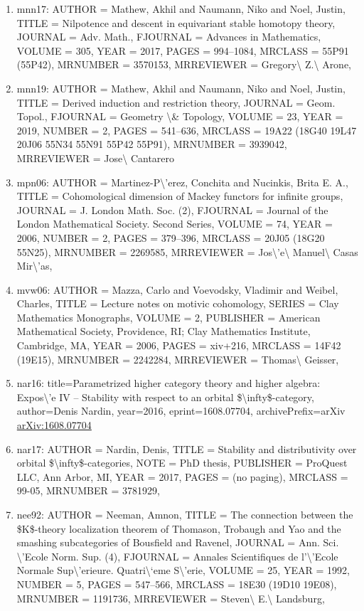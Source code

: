 \documentclass[11pt]{article}
\begin{document}
\begin{enumerate}[leftmargin=*]
  \item mnn17: AUTHOR = Mathew, Akhil and Naumann, Niko and Noel, Justin, TITLE = Nilpotence and descent in equivariant stable homotopy theory, JOURNAL = Adv. Math., FJOURNAL = Advances in Mathematics, VOLUME = 305, YEAR = 2017, PAGES = 994--1084, MRCLASS = 55P91 (55P42), MRNUMBER = 3570153, MRREVIEWER = Gregory\textbackslash{} Z.\textbackslash{} Arone,
  \item mnn19: AUTHOR = Mathew, Akhil and Naumann, Niko and Noel, Justin, TITLE = Derived induction and restriction theory, JOURNAL = Geom. Topol., FJOURNAL = Geometry \textbackslash{}\& Topology, VOLUME = 23, YEAR = 2019, NUMBER = 2, PAGES = 541--636, MRCLASS = 19A22 (18G40 19L47 20J06 55N34 55N91 55P42 55P91), MRNUMBER = 3939042, MRREVIEWER = Jose\textbackslash{} Cantarero
  \item mpn06: AUTHOR = Martinez-P\textbackslash{}'erez, Conchita and Nucinkis, Brita E. A., TITLE = Cohomological dimension of Mackey functors for infinite groups, JOURNAL = J. London Math. Soc. (2), FJOURNAL = Journal of the London Mathematical Society. Second Series, VOLUME = 74, YEAR = 2006, NUMBER = 2, PAGES = 379--396, MRCLASS = 20J05 (18G20 55N25), MRNUMBER = 2269585, MRREVIEWER = Jos\textbackslash{}'e\textbackslash{} Manuel\textbackslash{} Casas Mir\textbackslash{}'as,
  \item mvw06: AUTHOR = Mazza, Carlo and Voevodsky, Vladimir and Weibel, Charles, TITLE = Lecture notes on motivic cohomology, SERIES = Clay Mathematics Monographs, VOLUME = 2, PUBLISHER = American Mathematical Society, Providence, RI; Clay Mathematics Institute, Cambridge, MA, YEAR = 2006, PAGES = xiv+216, MRCLASS = 14F42 (19E15), MRNUMBER = 2242284, MRREVIEWER = Thomas\textbackslash{} Geisser,
  \item nar16: title=Parametrized higher category theory and higher algebra: Expos\textbackslash{}'e IV -- Stability with respect to an orbital \$\textbackslash{}infty\$-category, author=Denis Nardin, year=2016, eprint=1608.07704, archivePrefix=arXiv \href{https://arxiv.org/abs/1608.07704}{arXiv:1608.07704}
  \item nar17: AUTHOR = Nardin, Denis, TITLE = Stability and distributivity over orbital \$\textbackslash{}infty\$-categories, NOTE = PhD thesis, PUBLISHER = ProQuest LLC, Ann Arbor, MI, YEAR = 2017, PAGES = (no paging), MRCLASS = 99-05, MRNUMBER = 3781929,
  \item nee92: AUTHOR = Neeman, Amnon, TITLE = The connection between the \$K\$-theory localization theorem of Thomason, Trobaugh and Yao and the smashing subcategories of Bousfield and Ravenel, JOURNAL = Ann. Sci. \textbackslash{}'Ecole Norm. Sup. (4), FJOURNAL = Annales Scientifiques de l'\textbackslash{}'Ecole Normale Sup\textbackslash{}'erieure. Quatri\textbackslash{}`eme S\textbackslash{}'erie, VOLUME = 25, YEAR = 1992, NUMBER = 5, PAGES = 547--566, MRCLASS = 18E30 (19D10 19E08), MRNUMBER = 1191736, MRREVIEWER = Steven\textbackslash{} E.\textbackslash{} Landsburg,

\end{enumerate}
\end{document}
